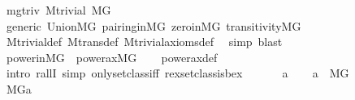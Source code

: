 \begin{isabellebody}
\isanewline
{}\isamarkupfalse%
\ mgtriv{\isacharcolon}{\kern0pt}\ M{\isacharunderscore}{\kern0pt}trivial\ {\isachardoublequoteopen}{\isacharhash}{\kern0pt}{\isacharhash}{\kern0pt}M{\isacharbrackleft}{\kern0pt}G{\isacharbrackright}{\kern0pt}{\isachardoublequoteclose}\isanewline
%
\isadelimproof
\ \ %
\endisadelimproof
%
\isatagproof
{}\isamarkupfalse%
\ generic\ Union{\isacharunderscore}{\kern0pt}MG\ pairing{\isacharunderscore}{\kern0pt}in{\isacharunderscore}{\kern0pt}MG\ zero{\isacharunderscore}{\kern0pt}in{\isacharunderscore}{\kern0pt}MG\ transitivity{\isacharunderscore}{\kern0pt}MG\isanewline
\ \ \isamarkupfalse%
\ M{\isacharunderscore}{\kern0pt}trivial{\isacharunderscore}{\kern0pt}def\ M{\isacharunderscore}{\kern0pt}trans{\isacharunderscore}{\kern0pt}def\ M{\isacharunderscore}{\kern0pt}trivial{\isacharunderscore}{\kern0pt}axioms{\isacharunderscore}{\kern0pt}def\ \isamarkupfalse%
\ {\isacharparenleft}{\kern0pt}simp{\isacharsemicolon}{\kern0pt}\ blast{\isacharparenright}{\kern0pt}%
\endisatagproof
{\isafoldproof}%
%
\isadelimproof
\isanewline
%
\endisadelimproof
\isanewline
\isanewline
{}\isamarkupfalse%
\ power{\isacharunderscore}{\kern0pt}in{\isacharunderscore}{\kern0pt}MG\ {\isacharcolon}{\kern0pt}\ {\isachardoublequoteopen}power{\isacharunderscore}{\kern0pt}ax{\isacharparenleft}{\kern0pt}{\isacharhash}{\kern0pt}{\isacharhash}{\kern0pt}{\isacharparenleft}{\kern0pt}M{\isacharbrackleft}{\kern0pt}G{\isacharbrackright}{\kern0pt}{\isacharparenright}{\kern0pt}{\isacharparenright}{\kern0pt}{\isachardoublequoteclose}\isanewline
%
\isadelimproof
\ \ %
\endisadelimproof
%
\isatagproof
{}\isamarkupfalse%
\ power{\isacharunderscore}{\kern0pt}ax{\isacharunderscore}{\kern0pt}def\isanewline
{}\isamarkupfalse%
\ {\isacharparenleft}{\kern0pt}intro\ rallI{\isacharcomma}{\kern0pt}\ simp\ only{\isacharcolon}{\kern0pt}setclass{\isacharunderscore}{\kern0pt}iff\ rex{\isacharunderscore}{\kern0pt}setclass{\isacharunderscore}{\kern0pt}is{\isacharunderscore}{\kern0pt}bex{\isacharparenright}{\kern0pt}\isanewline
\ \ \isanewline
\ \ \isamarkupfalse%
\ a\isanewline
\ \ \isamarkupfalse%
\ {\isachardoublequoteopen}a\ {\isasymin}\ M{\isacharbrackleft}{\kern0pt}G{\isacharbrackright}{\kern0pt}{\isachardoublequoteclose}\isanewline
\ \ \isamarkupfalse%
\isanewline
\ \ \isamarkupfalse%
\ {\isachardoublequoteopen}{\isacharparenleft}{\kern0pt}{\isacharhash}{\kern0pt}{\isacharhash}{\kern0pt}M{\isacharbrackleft}{\kern0pt}G{\isacharbrackright}{\kern0pt}{\isacharparenright}{\kern0pt}{\isacharparenleft}{\kern0pt}a{\isacharparenright}{\kern0pt}{\isachardoublequoteclose}\ \isamarkupfalse%

\end{isabellebody}
